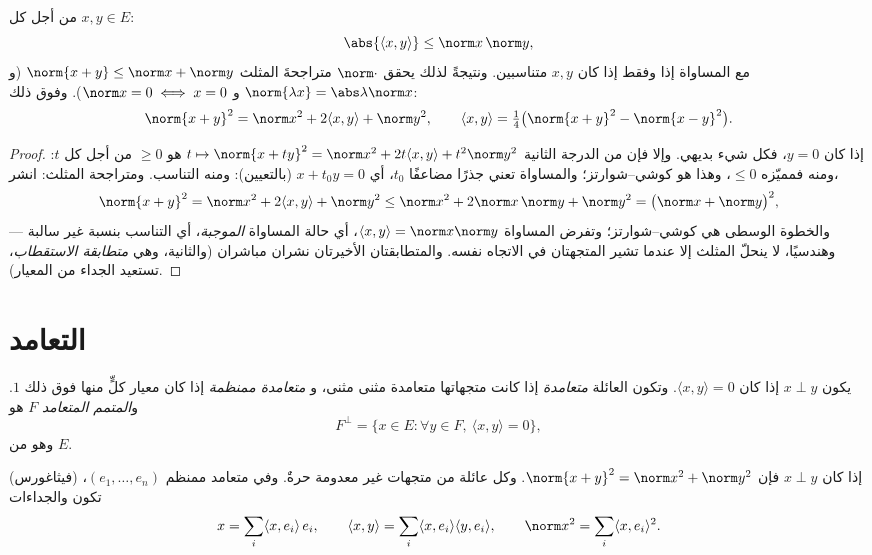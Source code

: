 \begin{theorem}\label{thm:b1:euclid:cs}
من أجل كل $x, y \in E$:
\[
\abs{\langle x, y\rangle} \leq \norm x\, \norm y ,
\]
مع المساواة إذا وفقط إذا كان $x, y$ متناسبين. ونتيجةً لذلك يحقق $\norm\cdot$
متراجحةَ المثلث $\norm{x + y} \leq \norm x + \norm
y$ (و $\norm{\lambda x} = \abs\lambda \norm x$ و $\norm x = 0 \iff
x = 0$). وفوق ذلك:
\[
\norm{x+y}^2 = \norm x^2 + 2\langle x, y\rangle + \norm y^2,
\qquad
\langle x, y \rangle = \tfrac14\bigl(\norm{x+y}^2 -
\norm{x-y}^2\bigr) .
\]
\end{theorem}

\begin{proof}
إذا كان $y = 0$، فكل شيء بديهي. وإلا فإن  من الدرجة الثانية $t
\mapsto \norm{x + ty}^2 = \norm x^2 + 2t\langle x, y\rangle + t^2
\norm y^2$ هو $\geq 0$ من أجل كل $t$: ومنه فمميّزه $\leq 0$،
وهذا هو كوشي--شوارتز؛ والمساواة تعني جذرًا مضاعفًا $t_0$، أي
$x + t_0 y = 0$ (بالتعيين): ومنه التناسب. ومتراجحة
المثلث: انشر،
\[
\norm{x + y}^2 = \norm x^2 + 2\langle x, y\rangle + \norm y^2
\leq \norm x^2 + 2\norm x\,\norm y + \norm y^2
= \bigl(\norm x + \norm y\bigr)^2 ,
\]
والخطوة الوسطى هي كوشي--شوارتز؛ وتفرض المساواة $\langle
x, y\rangle = \norm x\norm y$، أي حالة المساواة \emph{الموجبة}،
أي التناسب بنسبة غير سالبة ---
وهندسيًا، لا ينحلّ المثلث إلا عندما تشير المتجهتان
في الاتجاه نفسه. والمتطابقتان الأخيرتان
نشران مباشران (والثانية، وهي
\emph{متطابقة الاستقطاب}، تستعيد الجداء من المعيار).
\end{proof}

\section{التعامد}

\begin{definition}\label{def:b1:euclid:orthogonal}
يكون $x \perp y$ إذا كان $\langle x, y \rangle = 0$. وتكون العائلة
\emph{متعامدة} إذا كانت متجهاتها متعامدة مثنى مثنى، و
\emph{متعامدة ممنظمة} إذا كان معيار
كلٍّ منها فوق ذلك $1$. و\emph{المتمم المتعامد}  $F$ هو
\[
F^{\perp} = \{x \in E : \forall y \in F,\ \langle x, y\rangle =
0\},
\]
وهو  من $E$.
\end{definition}

\begin{proposition}\label{prop:b1:euclid:orthfree}
(فيثاغورس) إذا كان $x \perp y$ فإن
$\norm{x+y}^2 = \norm x^2 + \norm y^2$. وكل عائلة  من
متجهات غير معدومة حرةٌ. وفي  متعامد ممنظم $(e_1, \dots,
e_n)$، تكون  والجداءات
\[
x = \sum_{i} \langle x, e_i\rangle\, e_i,
\qquad
\langle x, y \rangle = \sum_i \langle x, e_i\rangle \langle y,
e_i\rangle,
\qquad
\norm x^2 = \sum_i \langle x, e_i\rangle^2 .
\]
\end{proposition}

